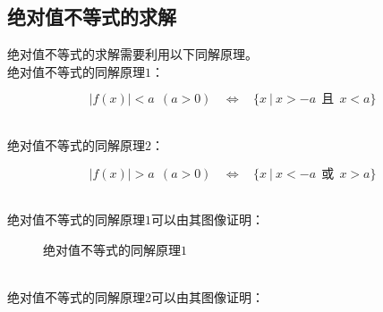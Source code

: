 \documentclass[UTF8]{ctexart}
\begin{document}
\subsection{绝对值不等式的求解}
    绝对值不等式的求解需要利用以下同解原理。\\[3mm]
    绝对值不等式的同解原理$1$：
    \begin{large}
        \begin{equation*}
            \big|f(x)\big|<a~~(a>0)~~~~\Longleftrightarrow~~~~\big\{x~|~x>-a~~\text{且}~~x<a\big\}
        \end{equation*}
    \end{large}\\
    绝对值不等式的同解原理$2$：
    \begin{large}
        \begin{equation*}
            \big|f(x)\big|>a~~(a>0)~~~~\Longleftrightarrow~~~~\big\{x~|~x<-a~~\text{或}~~x>a\big\}
        \end{equation*}
    \end{large}\\
    绝对值不等式的同解原理$1$可以由其图像证明：
    \begin{figure}[h]
        \begin{center}
            \caption{绝对值不等式的同解原理$1$}
        \end{center}
    \end{figure}\\
    绝对值不等式的同解原理$2$可以由其图像证明：
\end{document}
